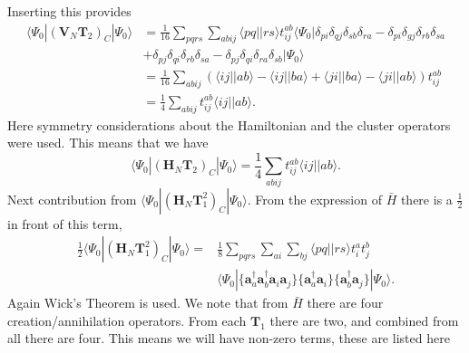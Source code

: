 \documentclass[a4paper,norsk,11pt,twoside]{report}
\begin{document}
Inserting this provides
\begin{align}
\langle \Psi_0 | (\textbf{V}_N \textbf{T}_2)_C | \Psi_0 \rangle & =  \frac{1}{16} \sum_{pqrs} \sum_{abij}  \langle pq||rs \rangle t_{ij}^{ab} \langle \Psi_0|
\delta_{pi} \delta_{qj} \delta_{sb} \delta_{ra} 
- \delta_{pi} \delta_{gj} \delta_{rb} \delta_{sa}\nonumber \\ & 
+ \delta_{pj} \delta_{qi} \delta_{rb} \delta_{sa}
- \delta_{pj} \delta_{qi} \delta_{ra} \delta_{sb}
| \Psi_0 \rangle \nonumber \\ &
= \frac{1}{16} \sum_{abij} ( 
\langle ij || ab \rangle
- \langle ij || ba \rangle
+ \langle ji || ba \rangle
- \langle ji || ab \rangle ) t_{ij}^{ab} \nonumber \\ &
= \frac{1}{4} \sum_{abij} t_{ij}^{ab} \langle ij||ab \rangle .
\end{align}
Here symmetry considerations about the Hamiltonian and the cluster operators were used. This means that we have
\begin{equation}
\langle \Psi_0 | (\textbf{H}_N \textbf{T}_2)_C | \Psi_0 \rangle = \frac{1}{4} \sum_{abij} t_{ij}^{ab} \langle ij||ab \rangle . \label{Energy_Contribution_2}
\end{equation}
Next contribution from $\langle \Psi_0 | (\textbf{H}_N \textbf{T}_1^2)_C | \Psi_0 \rangle$. From the expression of $\bar{H}$ there is a $\frac{1}{2}$ in front of this term,
\begin{align}
\frac{1}{2} \langle \Psi_0 | (\textbf{H}_N \textbf{T}_1^2)_C | \Psi_0 \rangle = & \frac{1}{8} \sum_{pqrs} \sum_{ai} \sum_{bj} \langle pq || rs \rangle t_i^a t_j^b \nonumber \\ & 
\langle \Psi_0| 
 \{\textbf{a}^{\dag}_a \textbf{a}^{\dag}_b \textbf{a}_i \textbf{a}_j \}
\{\textbf{a}^{\dag}_a \textbf{a}_i \}
\{\textbf{a}^{\dag}_b \textbf{a}_j \}
| \Psi_0 \rangle .
\end{align}
Again Wick's Theorem is used. We note that from $\bar{H}$ there are
four creation/annihilation operators. From each $\textbf{T}_1$ there
are two, and combined from all there are four. This means we will have
non-zero terms, these are listed here
\end{document}
